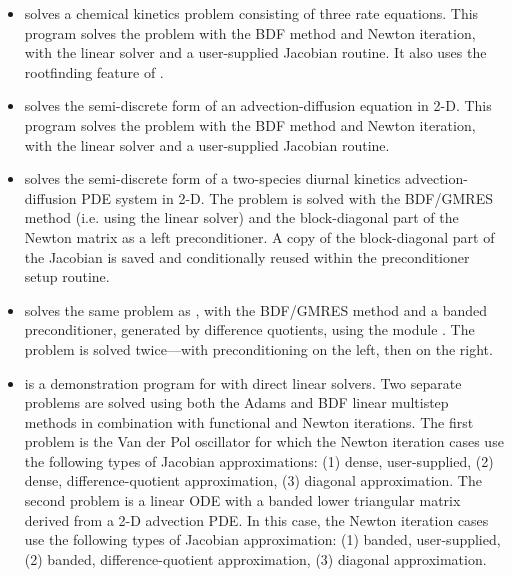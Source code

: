 \begin{itemize}
\item {}
  solves a chemical kinetics problem consisting of three rate equations.
  \newline
  This program solves the problem with the BDF method and Newton          
  iteration, with the {\cvdense} linear solver and a user-supplied    
  Jacobian routine.  It also uses the rootfinding feature of {\cvode}.
\item {}
  solves the semi-discrete form of an advection-diffusion equation in 2-D. 
  \newline
  This program solves the problem with the BDF method and Newton          
  iteration, with the {\cvband} linear solver and a user-supplied     
  Jacobian routine.
\item {}
  solves the semi-discrete form of a two-species diurnal kinetics
  advection-diffusion PDE system in 2-D.
  \newline
  The problem is solved with the BDF/GMRES method (i.e.    
  using the {\cvspgmr} linear solver) and the block-diagonal part of the  
  Newton matrix as a left preconditioner. A copy of the block-diagonal 
  part of the Jacobian is saved and conditionally reused within the    
  preconditioner setup routine.
\item {}
  solves the same problem as , with the BDF/GMRES method 
  and a banded preconditioner, generated by difference quotients, 
  using the module {\cvbandpre}.
  \newline
  The problem is solved twice---with preconditioning on the left,
  then on the right.
\item {}
  is a demonstration program for {\cvode} with direct linear solvers.
  \newline
  Two separate problems are solved using both the Adams and BDF linear
  multistep methods in combination with functional and Newton
  iterations. 
  \newline
  The first problem is the Van der Pol oscillator for which 
  the Newton iteration cases use the following types of Jacobian approximations:
  (1) dense, user-supplied, (2) dense, difference-quotient approximation, 
  (3) diagonal approximation. The second problem is a linear ODE with a
  banded lower triangular matrix derived from a 2-D advection PDE. In this
  case, the Newton iteration cases use the following types of Jacobian
  approximation: (1) banded, user-supplied, (2) banded, difference-quotient
  approximation, (3) diagonal approximation.

\end{itemize}
